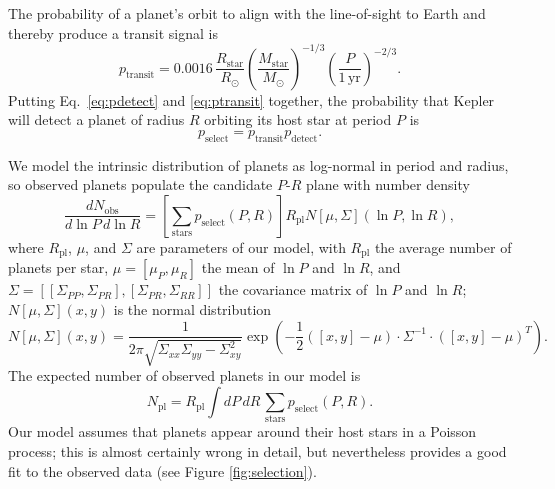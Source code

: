 \documentclass{nature}
\newcommand{\RSun}{R_\odot}
\newcommand{\RStar}{R_\mathrm{star}}
\newcommand{\MStar}{M_\mathrm{star}}
\newcommand{\MSun}{M_\odot}
\newcommand{\Rpl}{R_\mathrm{pl}}
\newcommand{\Npl}{N_\mathrm{pl}}
\begin{document}
The probability of a planet's orbit to align with the line-of-sight to
Earth and thereby produce a transit signal is
\begin{equation}
  \label{eq:ptransit}
  p_\mathrm{transit} = 0.0016\, \frac{\RStar}{\RSun}
  \left(\frac{\MStar}{\MSun}\right)^{-1/3} \left(\frac{P}{1\,\mathrm{yr}}\right)^{-2/3}.
\end{equation}
Putting Eq.\ \ref{eq:pdetect} and \ref{eq:ptransit} together, the
probability that Kepler will detect a planet of radius $R$ orbiting
its host star at period $P$ is 
\begin{equation}
  p_\mathrm{select} = p_\mathrm{transit} p_\mathrm{detect}.
\end{equation}

We model the intrinsic distribution of planets as log-normal in period
and radius, so observed planets populate the candidate $P$-$R$ plane
with number density
\begin{equation}
  \label{eq:foreground-rate}
  \frac{dN_\mathrm{obs}}{d\ln P\, d\ln R} = \left[ \sum_\mathrm{stars}
    p_\mathrm{select}(P, R) \right] \Rpl N\left[ \mu, \Sigma
    \right]\left( \ln P, \ln R \right),
\end{equation}
where $\Rpl$, $\mu$, and $\Sigma$ are parameters of our model, with
$\Rpl$ the average number of planets per star, $\mu = \left[ \mu_P,
  \mu_R \right]$ the mean of $\ln P$ and $\ln R$, and $\Sigma = \left[
  \left[ \Sigma_{PP}, \Sigma_{PR} \right], \left[ \Sigma_{PR},
    \Sigma_{RR} \right]\right]$ the covariance matrix of $\ln P$ and
$\ln R$; $N\left[ \mu, \Sigma \right](x,y)$ is the normal distribution 
\begin{equation}
  N\left[ \mu, \Sigma \right](x,y) = \frac{1}{2 \pi \sqrt{\Sigma_{xx}
      \Sigma_{yy} - \Sigma_{xy}^2}} \exp\left( - \frac{1}{2} \left(\left[
    x,y \right] - \mu \right) \cdot \Sigma^{-1} \cdot \left(\left[ x,
    y\right] - \mu \right)^T \right).
\end{equation}
The expected number of observed planets in our model is
\begin{equation}
  \Npl = \Rpl \int dP\,dR\, \sum_\mathrm{stars} p_\mathrm{select}(P,
  R).
\end{equation}
Our model assumes that planets appear around their host stars in a
Poisson process; this is almost certainly wrong in
detail\cite{Weissbein2012}, but nevertheless provides a good fit to
the observed data (see Figure \ref{fig:selection}).
\end{document}
